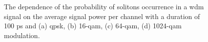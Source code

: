 \begin{figure}[htpb]
\begin{minipage}[h]{0.47\linewidth}
{        }
    \end{minipage}
    \vfill
    \begin{minipage}[h]{0.47\linewidth}
    \end{minipage}
    \hfill
    \begin{minipage}[h]{0.47\linewidth}
    \end{minipage}

    \caption{The dependence of the probability of solitons occurrence in a \acrshort{wdm} signal on the average signal power per channel with a duration of 100 ps and (a) \acrshort{qpsk}, (b) 16-\acrshort{qam}, (c) 64-\acrshort{qam}, (d) 1024-\acrshort{qam} modulation.}
    \label{fig:wdm_result_mod_all}
\end{figure}

